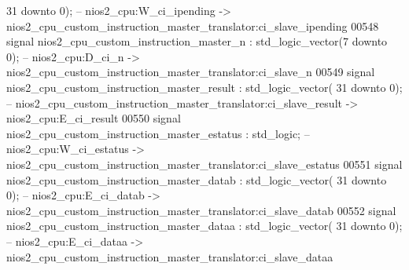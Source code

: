 \begin{DoxyCode}
{      31} \textcolor{keywordflow}{downto} \textcolor{vhdllogic}{}\textcolor{vhdllogic}{0}\textcolor{vhdlchar}{)};\textcolor{keyword}{ -- nios2\_cpu:W\_ci\_ipending -> nios2\_cpu\_custom\_instruction\_master\_translator:ci\_slave\_ipending}
00548     \textcolor{keywordflow}{signal} \textcolor{vhdlchar}{nios2_cpu_custom_instruction_master_n}                                       \textcolor{vhdlchar}{:} \textcolor{comment}{std\_logic\_vector}\textcolor{vhdlchar}{(}\textcolor{vhdllogic}{}\textcolor{vhdllogic}{7}
       \textcolor{keywordflow}{downto} \textcolor{vhdllogic}{}\textcolor{vhdllogic}{0}\textcolor{vhdlchar}{)};\textcolor{keyword}{  -- nios2\_cpu:D\_ci\_n -> nios2\_cpu\_custom\_instruction\_master\_translator:ci\_slave\_n}
00549     \textcolor{keywordflow}{signal} \textcolor{vhdlchar}{nios2_cpu_custom_instruction_master_result}                                  \textcolor{vhdlchar}{:} \textcolor{comment}{std\_logic\_vector}\textcolor{vhdlchar}{(}\textcolor{vhdllogic}{}\textcolor{vhdllogic}{
      31} \textcolor{keywordflow}{downto} \textcolor{vhdllogic}{}\textcolor{vhdllogic}{0}\textcolor{vhdlchar}{)};\textcolor{keyword}{ -- nios2\_cpu\_custom\_instruction\_master\_translator:ci\_slave\_result -> nios2\_cpu:E\_ci\_result}
00550     \textcolor{keywordflow}{signal} \textcolor{vhdlchar}{nios2_cpu_custom_instruction_master_estatus}                                 \textcolor{vhdlchar}{:} \textcolor{comment}{std\_logic};\textcolor{keyword}{        
                   -- nios2\_cpu:W\_ci\_estatus -> nios2\_cpu\_custom\_instruction\_master\_translator:ci\_slave\_estatus}
00551     \textcolor{keywordflow}{signal} \textcolor{vhdlchar}{nios2_cpu_custom_instruction_master_datab}                                   \textcolor{vhdlchar}{:} \textcolor{comment}{std\_logic\_vector}\textcolor{vhdlchar}{(}\textcolor{vhdllogic}{}\textcolor{vhdllogic}{
      31} \textcolor{keywordflow}{downto} \textcolor{vhdllogic}{}\textcolor{vhdllogic}{0}\textcolor{vhdlchar}{)};\textcolor{keyword}{ -- nios2\_cpu:E\_ci\_datab -> nios2\_cpu\_custom\_instruction\_master\_translator:ci\_slave\_datab}
00552     \textcolor{keywordflow}{signal} \textcolor{vhdlchar}{nios2_cpu_custom_instruction_master_dataa}                                   \textcolor{vhdlchar}{:} \textcolor{comment}{std\_logic\_vector}\textcolor{vhdlchar}{(}\textcolor{vhdllogic}{}\textcolor{vhdllogic}{
      31} \textcolor{keywordflow}{downto} \textcolor{vhdllogic}{}\textcolor{vhdllogic}{0}\textcolor{vhdlchar}{)};\textcolor{keyword}{ -- nios2\_cpu:E\_ci\_dataa -> nios2\_cpu\_custom\_instruction\_master\_translator:ci\_slave\_dataa}

\end{DoxyCode}

